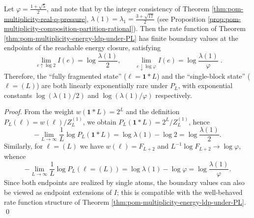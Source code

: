 \begin{corollary}\label{cor:pom-multiplicity-energy-ldp-boundary}
Let \(\varphi=\frac{1+\sqrt5}{2}\), and note that by the integer consistency of Theorem \ref{thm:pom-multiplicity-real-q-pressure},
\(
\lambda(1)=\lambda_1=\frac{3+\sqrt{17}}{2}
\) (see Proposition \ref{prop:pom-multiplicity-composition-partition-rational}).
Then the rate function of Theorem \ref{thm:pom-multiplicity-energy-ldp-under-PL} has finite boundary values at the endpoints of the reachable energy closure, satisfying
\[
\boxed{\;
\lim_{e\uparrow \log 2} I(e)=\log\frac{\lambda(1)}{2},\qquad
\lim_{e\downarrow \log\varphi} I(e)=\log\frac{\lambda(1)}{\varphi}\; } .
\]
Therefore, the ``fully fragmented state'' (\(\boldsymbol{\ell}=\boldsymbol{1}*L\)) and the ``single-block state'' (\(\boldsymbol{\ell}=(L)\)) are both linearly exponentially rare under \(P_L\), with exponential constants \(\log(\lambda(1)/2)\) and \(\log(\lambda(1)/\varphi)\) respectively.
\end{corollary}
\begin{proof}
From the weight \(w(\boldsymbol{1}*L)=2^L\) and the definition \(P_L(\boldsymbol{\ell})=w(\boldsymbol{\ell})/Z_L^{(1)}\), we obtain
\(
P_L(\boldsymbol{1}*L)=2^L/Z_L^{(1)}
\), hence
\[
-\lim_{L\to\infty}\frac1L\log P_L(\boldsymbol{1}*L)=\log\lambda(1)-\log 2=\log\frac{\lambda(1)}{2}.
\]
Similarly, for \(\boldsymbol{\ell}=(L)\) we have \(w(\boldsymbol{\ell})=F_{L+2}\) and \(L^{-1}\log F_{L+2}\to\log\varphi\), whence
\[
-\lim_{L\to\infty}\frac1L\log P_L(\boldsymbol{\ell}=(L))=\log\lambda(1)-\log\varphi=\log\frac{\lambda(1)}{\varphi}.
\]
Since both endpoints are realized by single atoms, the boundary values can also be viewed as endpoint extensions of \(I\); this is compatible with the well-behaved rate function structure of Theorem \ref{thm:pom-multiplicity-energy-ldp-under-PL}. \qed
\end{proof}

